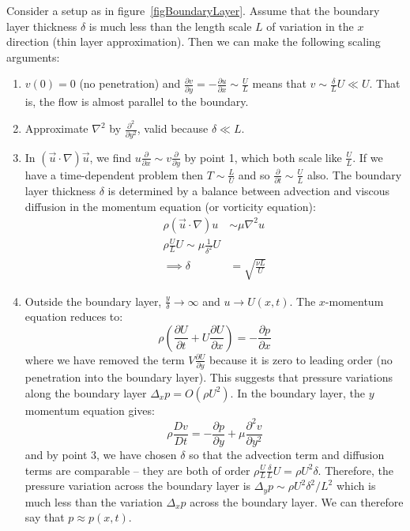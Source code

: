 \documentclass[../Main.tex]{subfiles}
\begin{document}
Consider a setup as in figure~\ref{figBoundaryLayer}. Assume that the boundary layer thickness $\delta$ is much less than the length scale $L$ of variation in the $x$ direction (thin layer approximation). Then we can make the following scaling arguments:
\begin{enumerate}
    \item $v(0) = 0$ (no penetration) and $\frac{\partial v}{\partial y} = -\frac{\partial u}{\partial x} \sim \frac U L$ means that $v \sim \frac{\delta }{L} U \ll U$. That is, the flow is almost parallel to the boundary.
    \item Approximate $\nabla^2$ by $\frac{\partial^{2}}{\partial y^{2}}$, valid because $\delta \ll L$.
    \item In $(\vec{u} \cdot \nabla)\vec u$, we find $u \frac{\partial }{\partial x} \sim v \frac{\partial }{\partial y}$ by point 1, which both scale like $\frac U L$. If we have a time-dependent problem then $T \sim \frac L U$ and so $\frac{\partial }{\partial t} \sim \frac{U}{L}$ also. The boundary layer thickness $\delta$ is determined by a balance between advection and viscous diffusion in the momentum equation (or vorticity equation):
        \begin{align*}
            \rho (\vec{u} \cdot \nabla)u &\sim \mu \nabla^2u \\
            \rho \frac{U}{L} U \sim \mu \frac{1}{\delta^2} U \\
            \implies \delta &= \sqrt{\frac{\nu L}{U}}
        \end{align*}
    \item Outside the boundary layer, $\frac y \delta \to \infty$ and $u \to U(x, t)$. The $x$-momentum equation reduces to:
        \begin{equation*}
            \rho \left(\frac{\partial U}{\partial t} + U \frac{\partial U}{\partial x} \right) = -\frac{\partial p}{\partial x}
        \end{equation*}
        where we have removed the term $V \frac{\partial U}{\partial y}$ because it is zero to leading order (no penetration into the boundary layer). This suggests that pressure variations along the boundary layer $\Delta_x p = O(\rho U^2)$. In the boundary layer, the $y$ momentum equation gives:
        \begin{equation*}
            \rho \frac{D v}{D t} = -\frac{\partial p}{\partial y} + \mu \frac{\partial^{2}v}{\partial y^{2}}
        \end{equation*}
        and by point 3, we have chosen $\delta$ so that the advection term and diffusion terms are comparable -- they are both of order $\rho \frac U L \frac\delta L U = \rho U^2 \delta$. Therefore, the pressure variation across the boundary layer is $\Delta_y p \sim \rho U^2 \delta^2 / L^2$ which is much less than the variation $\Delta_x p$ across the boundary layer. We can therefore say that $p \approx p(x, t)$.
\end{enumerate}
\end{document}
